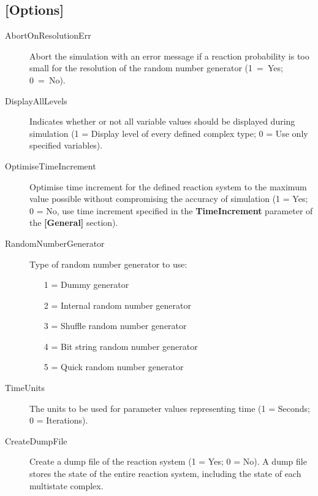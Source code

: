 \subsection{[Options]}
\begin{description}
\item[AbortOnResolutionErr] Abort the simulation with an error message
  if a reaction probability is too small for the resolution of the
  random number generator (\mbox{1 = Yes}; \mbox{0 = No}).
  
\item[DisplayAllLevels] Indicates whether or not all variable values
  should be displayed during simulation (1 = Display level of every
  defined complex type; 0 = Use only specified variables).
  
\item[OptimiseTimeIncrement] Optimise time increment for the defined
  reaction system to the maximum value possible without compromising
  the accuracy of simulation (1 = Yes; 0 = No, use time increment
  specified in the \textbf{TimeIncrement} parameter of the
  \textbf{[General]} section).

\item[RandomNumberGenerator] Type of random number generator to use:
  \begin{itemize}
  \item[1] = Dummy generator
  \item[2] = Internal random number generator
  \item[3] = Shuffle random number generator
  \item[4] = Bit string random number generator
  \item[5] = Quick random number generator
  \end{itemize}
  
\item[TimeUnits] The units to be used for parameter values
  representing time (1 = Seconds; 0 = Iterations).
  
\item[CreateDumpFile] Create a dump file of the reaction system (1 =
  Yes; 0 = No).  A dump file stores the state of the entire reaction
  system, including the state of each multistate complex.
\end{description}

